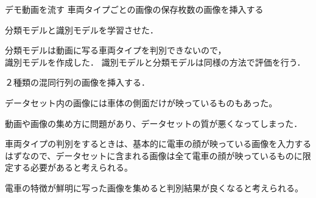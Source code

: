 デモ動画を流す
\newpage
車両タイプごとの画像の保存枚数の画像を挿入する


分類モデルと識別モデルを学習させた．

分類モデルは動画に写る車両タイプを判別できないので，\\
識別モデルを作成した．
識別モデルと分類モデルは同様の方法で評価を行う．
\newpage
２種類の混同行列の画像を挿入する．



データセット内の画像には車体の側面だけが映っているものもあった。

動画や画像の集め方に問題があり、データセットの質が悪くなってしまった．

車両タイプの判別をするときは、基本的に電車の顔が映っている画像を入力するはずなので、データセットに含まれる画像は全て電車の顔が映っているものに限定する必要があると考えられる。

電車の特徴が鮮明に写った画像を集めると判別結果が良くなると考えられる。





